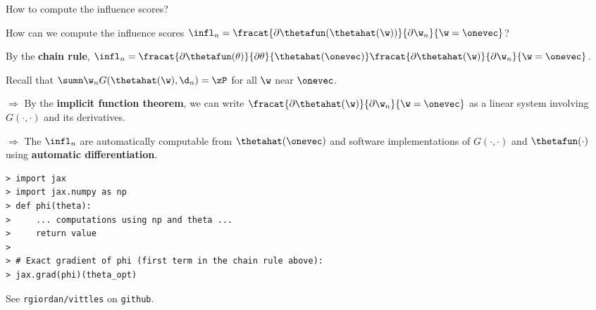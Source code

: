 \begin{frame}[fragile]{How to compute the influence scores?}

How can we compute the influence scores
%
%
$
\infl_n =
\fracat{\partial \thetafun(\thetahat(\w))}
       {\partial\w_n}{\w = \onevec}
%
$?
%

\pause
\vspace{1em}
By the \textbf{chain rule},
$
\infl_n =
\fracat{\partial \thetafun(\theta)}
      {\partial\theta}{\thetahat(\onevec)}
\fracat{\partial \thetahat(\w)}
    {\partial\w_n}{\w = \onevec}
%
$.

\pause
\vspace{1em}
Recall that
$\sumn \w_n G(\thetahat(\w), \d_{n}) =  \zP$ for all $\w$ near $\onevec$.

\vspace{1em}
$\Rightarrow$
By the \textbf{implicit function theorem}, we can write
$\fracat{\partial\thetahat(\w)}{\partial\w_n}{\w=\onevec}$ as a linear system
involving $G(\cdot, \cdot)$ and its derivatives.

\pause
\vspace{1em}
$\Rightarrow$
The $\infl_n$ are automatically computable from $\thetahat(\onevec)$ and
software implementations of $G(\cdot, \cdot)$ and $\thetafun(\cdot)$
using \textbf{automatic differentiation}.

\begin{lstlisting}
> import jax
> import jax.numpy as np
> def phi(theta):
>     ... computations using np and theta ...
>     return value
>
> # Exact gradient of phi (first term in the chain rule above):
> jax.grad(phi)(theta_opt)
\end{lstlisting}

See \texttt{rgiordan/vittles} on \texttt{github}.

\end{frame}




